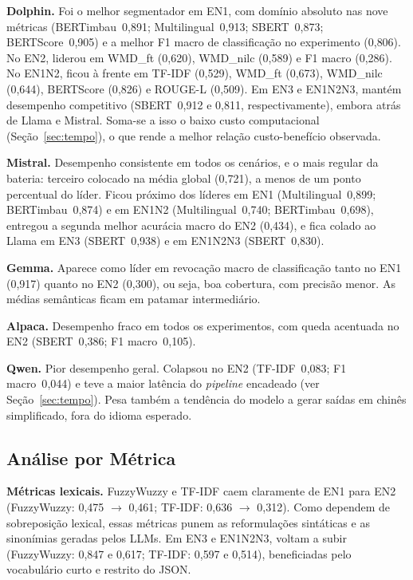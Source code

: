 \documentclass[a4paper,fleqn]{cas-sc}
\begin{document}
\textbf{Dolphin.} Foi o melhor segmentador em EN1, com domínio absoluto nas nove métricas (BERTimbau~0{,}891; Multilingual~0{,}913; SBERT~0{,}873; BERTScore~0{,}905) e a melhor F1 macro de classificação no experimento (0{,}806). No EN2, liderou em WMD\_ft (0{,}620), WMD\_nilc (0{,}589) e F1 macro (0{,}286). No EN1N2, ficou à frente em TF-IDF (0{,}529), WMD\_ft (0{,}673), WMD\_nilc (0{,}644), BERTScore (0{,}826) e ROUGE-L (0{,}509). Em EN3 e EN1N2N3, mantém desempenho competitivo (SBERT~0{,}912 e 0{,}811, respectivamente), embora atrás de Llama e Mistral. Soma-se a isso o baixo custo computacional (Seção~\ref{sec:tempo}), o que rende a melhor relação custo-benefício observada.

\textbf{Mistral.} Desempenho consistente em todos os cenários, e o mais regular da bateria: terceiro colocado na média global (0{,}721), a menos de um ponto percentual do líder. Ficou próximo dos líderes em EN1 (Multilingual~0{,}899; BERTimbau~0{,}874) e em EN1N2 (Multilingual~0{,}740; BERTimbau~0{,}698), entregou a segunda melhor acurácia macro do EN2 (0{,}434), e fica colado ao Llama em EN3 (SBERT~0{,}938) e em EN1N2N3 (SBERT~0{,}830).

\textbf{Gemma.} Aparece como líder em revocação macro de classificação tanto no EN1 (0{,}917) quanto no EN2 (0{,}300), ou seja, boa cobertura, com precisão menor. As médias semânticas ficam em patamar intermediário.

\textbf{Alpaca.} Desempenho fraco em todos os experimentos, com queda acentuada no EN2 (SBERT~0{,}386; F1 macro~0{,}105).

\textbf{Qwen.} Pior desempenho geral. Colapsou no EN2 (TF-IDF~0{,}083; F1 macro~0{,}044) e teve a maior latência do \textit{pipeline} encadeado (ver Seção~\ref{sec:tempo}). Pesa também a tendência do modelo a gerar saídas em chinês simplificado, fora do idioma esperado.

\subsection{Análise por Métrica}

\textbf{Métricas lexicais.} FuzzyWuzzy e TF-IDF caem claramente de EN1 para EN2 (FuzzyWuzzy: 0{,}475 $\rightarrow$ 0{,}461; TF-IDF: 0{,}636 $\rightarrow$ 0{,}312). Como dependem de sobreposição lexical, essas métricas punem as reformulações sintáticas e as sinonímias geradas pelos LLMs. Em EN3 e EN1N2N3, voltam a subir (FuzzyWuzzy: 0{,}847 e 0{,}617; TF-IDF: 0{,}597 e 0{,}514), beneficiadas pelo vocabulário curto e restrito do JSON.
\end{document}
